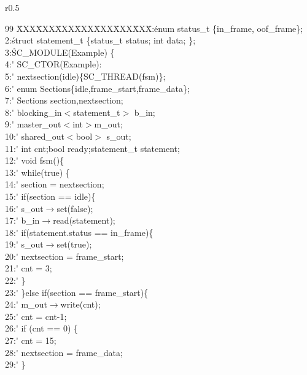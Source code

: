 \begin{wrapfigure}{r}{0.5\textwidth}
  \centering  
  \begin{minipage}{0.9\linewidth}
    \sffamily\small
    \begin{tabbing}
99 \= XXX\=XXX\=XXX\=XXX\=XXX\=XXX\=XXX\=:\' enum status\_t \{in\_frame, oof\_frame\};\\
2:\' struct statement\_t \{status\_t status; int data; \};\\
3:\' SC\_MODULE(Example) \{ \\
4:\'\> SC\_CTOR(Example): \\
5:\'\>\> nextsection(idle)\{SC\_THREAD(fsm)\}; \\
6:\'\> enum Sections\{idle,frame\_start,frame\_data\}; \\
7:\'\> Sections section,nextsection; \\
8:\'\> blocking\_in$<$statement\_t$>$ b\_in; \\
9:\'\> master\_out$<$int$>$m\_out; \\
10:\'\> shared\_out$<$bool$>$ s\_out; \\
11:\'\> int cnt;bool ready;statement\_t statement; \\
12:\'\> void fsm()\{ \\
13:\'\>\> while(true) \{ \\
14:\'\>\>\> section = nextsection; \\
15:\'\>\>\> if(section == idle)\{ \\
16:\'\>\>\>\> s\_out$\rightarrow$set(false); \\
17:\'\>\>\>\> b\_in$\rightarrow$read(statement);\\
18:\'\>\>\>\> if(statement.status == in\_frame)\{\\
19:\'\>\>\>\>\> s\_out$\rightarrow$set(true); \\
20:\'\>\>\>\>\> nextsection = frame\_start;\\
21:\'\>\>\>\>\> cnt = 3;\\
22:\'\>\>\>\> \}\\
23:\'\>\>\> \}else if(section == frame\_start)\{ \\
24:\'\>\>\>\> m\_out$\rightarrow$write(cnt);\\
25:\'\>\>\>\> cnt = cnt-1;\\
26:\'\>\>\>\> if (cnt == 0) \{\\
27:\'\>\>\>\>\> cnt = 15;\\
28:\'\>\>\>\>\> nextsection = frame\_data;\\
29:\'\>\>\>\> \}\\

\end{tabbing}
\end{minipage}
\end{wrapfigure}
